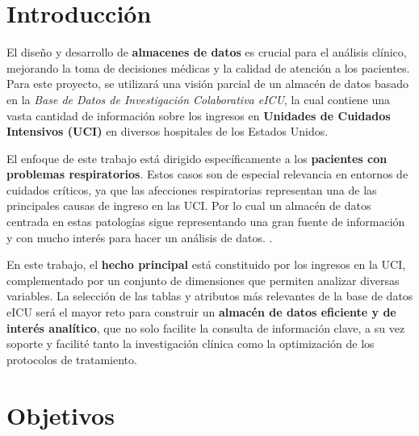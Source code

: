\documentclass[12pt, a4paper, twoside]{article}
\begin{document}
	
	
	
	\clearpage
	\setcounter{page}{1}
	
	
	
	\tableofcontents
	\newpage
	
	
	\section{Introducción}
	
	El diseño y desarrollo de \textbf{almacenes de datos} es crucial para el análisis clínico, mejorando la toma de decisiones médicas y la calidad de atención a los pacientes. Para este proyecto, se utilizará una visión parcial de un almacén de datos basado en la \textit{Base de Datos de Investigación Colaborativa eICU}, la cual contiene una vasta cantidad de información sobre los ingresos en \textbf{Unidades de Cuidados Intensivos (UCI)} en diversos hospitales de los Estados Unidos.\cite{futuro}
	
	El enfoque de este trabajo está dirigido específicamente a los \textbf{pacientes con problemas respiratorios}. Estos casos son de especial relevancia en entornos de cuidados críticos, ya que las afecciones respiratorias representan una de las principales causas de ingreso en las UCI. Por lo cual un almacén de datos centrada en estas patologías sigue representando una gran fuente de información y con mucho interés para hacer un análisis de datos. \cite{pekar2021epidemiology, vincent2006epidemiology}.
	
	En este trabajo, el \textbf{hecho principal} está constituido por los ingresos en la UCI, complementado por un conjunto de dimensiones que permiten analizar diversas variables. La selección de las tablas y atributos más relevantes de la base de datos eICU será el mayor reto para construir un \textbf{almacén de datos eficiente y de interés analítico}, que no solo facilite la consulta de información clave,
	a su vez soporte y facilité tanto la investigación clínica como la optimización de los protocolos de tratamiento.
	
	\section{Objetivos}
	
\end{document}
